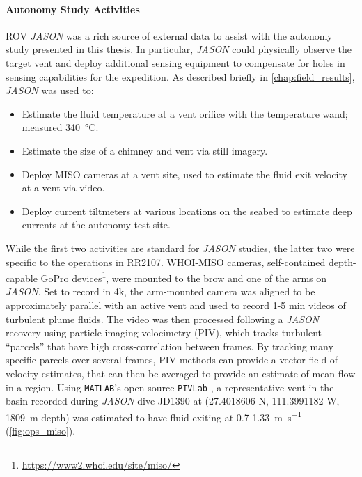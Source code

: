 \paragraph{Autonomy Study Activities}
ROV \emph{JASON} was a rich source of external data to assist with the autonomy study presented in this thesis. In particular, \emph{JASON} could physically observe the target vent and deploy additional sensing equipment to compensate for holes in \Sentry sensing capabilities for the expedition. As described briefly in \cref{chap:field_results}, \emph{JASON} was used to:
\begin{itemize}
  \item Estimate the fluid temperature at a vent orifice with the temperature wand; measured \SI{340}{\celsius}.
  \item Estimate the size of a chimney and vent via still imagery.
  \item Deploy MISO cameras at a vent site, used to estimate the fluid exit velocity at a vent via video.
  \item Deploy current tiltmeters at various locations on the seabed to estimate deep currents at the autonomy test site.
\end{itemize}

While the first two activities are standard for \emph{JASON} studies, the latter two were specific to the operations in RR2107. 
WHOI-MISO cameras, self-contained depth-capable GoPro devices\footnote{\url{https://www2.whoi.edu/site/miso/}}, were mounted to the brow and one of the arms on \emph{JASON}. Set to record in 4k, the arm-mounted camera was aligned to be approximately parallel with an active vent and used to record 1-5 min videos of turbulent plume fluids. The video was then processed following a \emph{JASON} recovery using particle imaging velocimetry \autocite{zhang2019time} (PIV), which tracks turbulent ``parcels'' that have high cross-correlation between frames. By tracking many specific parcels over several frames, PIV methods can provide a vector field of velocity estimates, that can then be averaged to provide an estimate of mean flow in a region. Using \verb|MATLAB|'s open source \verb|PIVLab| \autocite{thielicke2021particle,thielicke2014pivlab,thielicke2014flapping}, a representative vent in the basin recorded during \emph{JASON} dive JD1390 at (27.4018606 N, 111.3991182 W, \SI{1809}{\meter} depth) was estimated to have fluid exiting at 0.7-\SI{1.33}{\meter\per\second} (\cref{fig:ops_miso}).

